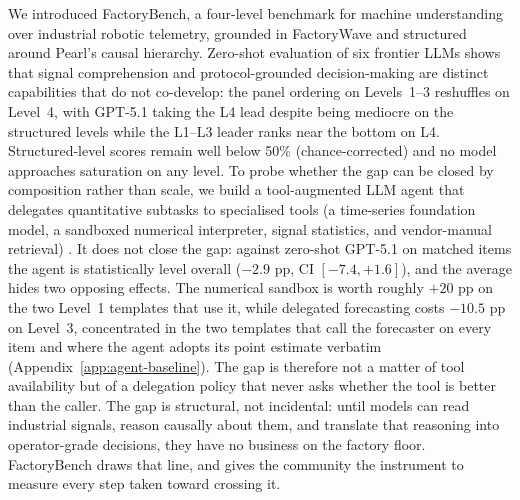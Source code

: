 We introduced FactoryBench, a four-level benchmark for machine understanding over industrial robotic telemetry, grounded in FactoryWave and structured around Pearl's causal hierarchy. Zero-shot evaluation of six frontier LLMs shows that signal comprehension and protocol-grounded decision-making are distinct capabilities that do not co-develop: the panel ordering on Levels~1--3 reshuffles on Level~4, with GPT-5.1 taking the L4 lead despite being mediocre on the structured levels while the L1--L3 leader ranks near the bottom on L4. Structured-level scores remain well below 50\% (chance-corrected) and no model approaches saturation on any level. To probe whether the gap can be closed by composition rather than scale, we build a tool-augmented LLM agent that delegates quantitative subtasks to specialised tools (a time-series foundation model, a sandboxed numerical interpreter, signal statistics, and vendor-manual retrieval) \cite{schick2023toolformer,yao2023react,qin2023tool}. It does not close the gap: against zero-shot GPT-5.1 on matched items the agent is statistically level overall ($-2.9$ pp, CI $[-7.4, +1.6]$), and the average hides two opposing effects. The numerical sandbox is worth roughly $+20$ pp on the two Level~1 templates that use it, while delegated forecasting costs $-10.5$ pp on Level~3, concentrated in the two templates that call the forecaster on every item and where the agent adopts its point estimate verbatim (Appendix~\ref{app:agent-baseline}). The gap is therefore not a matter of tool availability but of a delegation policy that never asks whether the tool is better than the caller. The gap is structural, not incidental: until models can read industrial signals, reason causally about them, and translate that reasoning into operator-grade decisions, they have no business on the factory floor. FactoryBench draws that line, and gives the community the instrument to measure every step taken toward crossing it.

\newpage


%



\ifneuripschecklist\fi

